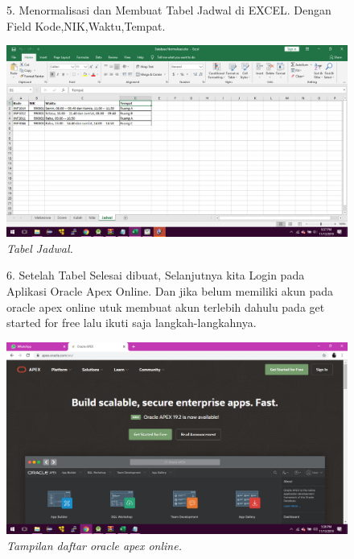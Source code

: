 \begin{enumerate}
\begin{figure}
\item[5.]Menormalisasi dan Membuat Tabel Jadwal di EXCEL. Dengan Field Kode,NIK,Waktu,Tempat.
    \begin{center}
    \includegraphics[scale=0.3]{figures/jadwal.png}
    \caption{\textit{Tabel Jadwal.}}
    \end{center}
    \label{gambar}
    \end{figure}

\begin{figure}
\item[6.] Setelah Tabel Selesai dibuat, Selanjutnya kita Login pada Aplikasi Oracle Apex Online. Dan jika belum memiliki akun pada oracle apex online utuk membuat akun terlebih dahulu pada get started for free lalu ikuti saja langkah-langkahnya.
    \begin{center}
    \includegraphics[scale=0.3]{figures/1.png}
    \caption{\textit{Tampilan daftar oracle apex online.}}
     \end{center}
    \label{gambar}
    \end{figure}


\end{enumerate}
